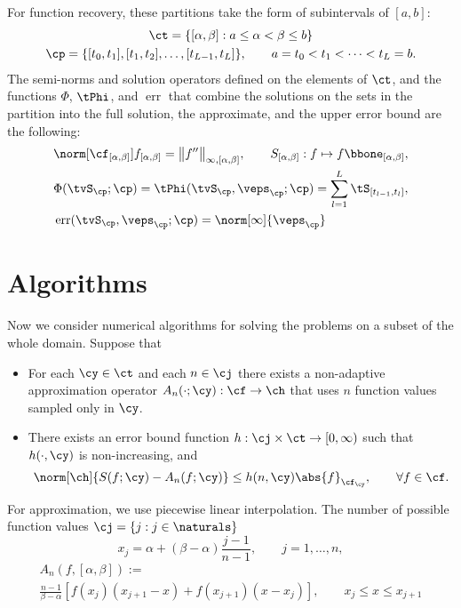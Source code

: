 \documentclass[]{elsarticle}
\DeclareMathOperator{\err}{err}
\theoremstyle{definition}
\theoremstyle{remark}
\newcommand{\FYnorm}[1]{\abs{#1}_{\cf_\cy}}
\newcommand{\Hnorm}[1]{\norm[\ch]{#1}}
\begin{document}
For function recovery, these partitions take the form of subintervals of $[a,b]$:
\begin{gather*}
\ct=\{[\alpha,\beta] : a \le \alpha < \beta \le b \} \\
\cp=\{[t_0,t_1], [t_1,t_2],  \ldots, [t_{L-1},t_L]\}, \qquad a=t_0 < t_1 < \cdots < t_L=b.
\end{gather*}
The semi-norms and solution operators defined on the elements of $\ct$, and the functions $\Phi$, $\tPhi$, and $\err$ that combine the solutions on the sets in the partition into the full solution, the approximate, and the upper error bound are the following:
\begin{align*}
&  \norm[\cf_{[\alpha,\beta]}]{f_{[\alpha,\beta]}} = \bigl \lVert f'' \bigr \rVert_{\infty,[\alpha,\beta]}, \qquad S_{[\alpha,\beta]}: f \mapsto f \bbone_{[\alpha,\beta]}, \\
& \Phi(\tvS_{\cp};\cp) = \tPhi(\tvS_{\cp},\veps_{\cp};\cp) = \sum_{l=1}^L  \tS_{[t_{l-1},t_l]}, \\
&\err(\tvS_{\cp},\veps_{\cp};\cp) = \norm[\infty]{\veps_{\cp}}
\end{align*}

\section{Algorithms}
Now we consider numerical algorithms for solving the problems on a subset of the whole domain.  Suppose that
\begin{itemize}

\item For each $\cy \in \ct$ and each $n \in \cj$ there exists a non-adaptive approximation operator $A_n(\cdot;\cy) : \cf \to \ch$ that uses $n$ function values sampled only in $\cy$.

\item There exists an error bound function $h:\cj \times \ct \to [0,\infty)$ such that $h(\cdot,\cy)$ is non-increasing, and
\[
\Hnorm{S(f;\cy) - A_n(f;\cy)} \le h(n,\cy) \FYnorm{f}, \qquad \forall f \in \cf.
\]
\end{itemize}

For approximation, we use piecewise linear interpolation. The number of possible function values $\cj=\{j : j \in \naturals\}$
\begin{equation}
x_j= \alpha + (\beta-\alpha) \frac{j-1}{n-1}, \qquad j=1, \ldots, n,
\end{equation}
\begin{multline}
A_n(f,[\alpha,\beta]):=\\
\frac{n-1}{\beta-\alpha}\left[f(x_j)(x_{j+1}-x)+f(x_{j+1})(x-x_j)\right], \qquad  x_{j}\le x \le x_{j+1}
\end{multline}
\end{document}
